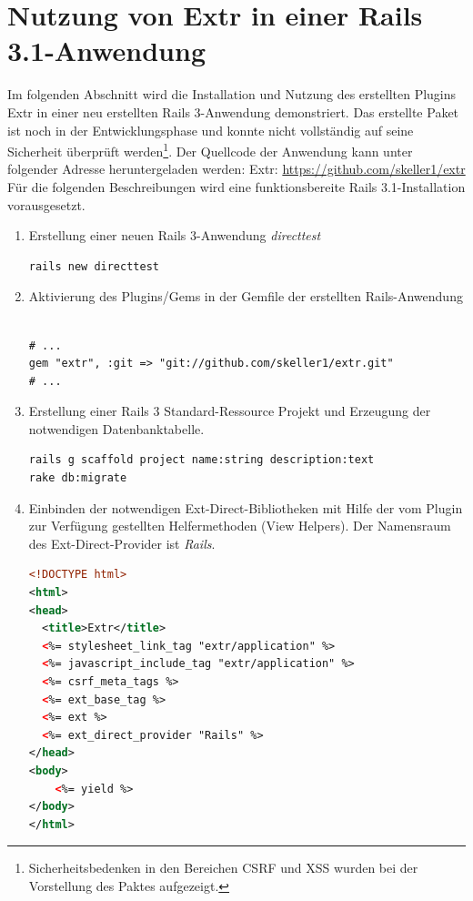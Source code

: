\section{Nutzung von Extr in einer Rails 3.1-Anwendung}
Im folgenden Abschnitt wird die Installation und Nutzung des erstellten Plugins Extr in einer neu erstellten Rails 3-Anwendung demonstriert. Das erstellte Paket ist noch in der Entwicklungsphase und konnte nicht vollständig auf seine Sicherheit überprüft werden\footnote{Sicherheitsbedenken in den Bereichen CSRF und XSS wurden bei der Vorstellung des Paktes aufgezeigt.}. Der Quellcode der Anwendung kann unter folgender Adresse heruntergeladen werden:
Extr: \href{https://github.com/skeller1/extr}{https://github.com/skeller1/extr}
Für die folgenden Beschreibungen wird eine funktionsbereite Rails 3.1-Installation vorausgesetzt.
\begin{enumerate}
\item
Erstellung einer neuen Rails 3-Anwendung \emph{directtest}
\begin{lstlisting}[frame=single, numbers=none]
rails new directtest
\end{lstlisting}
\item
Aktivierung des Plugins/Gems in der Gemfile der erstellten Rails-Anwendung

\begin{lstlisting}[frame=single, numbers=none]

# ...
gem "extr", :git => "git://github.com/skeller1/extr.git"
# ...

\end{lstlisting}

\item
Erstellung einer Rails 3 Standard-Ressource Projekt und Erzeugung der notwendigen Datenbanktabelle.

\begin{lstlisting}[frame=single, numbers=none]
rails g scaffold project name:string description:text
rake db:migrate
\end{lstlisting}

\item
Einbinden der notwendigen Ext-Direct-Bibliotheken mit Hilfe der vom Plugin zur Verfügung gestellten Helfermethoden (View Helpers). Der Namensraum des Ext-Direct-Provider ist \emph{Rails}.

\begin{lstlisting}[language=xml,frame=single,title=\emph{app/views/layouts/application.html.erb}, numbers=none]
<!DOCTYPE html>
<html>
<head>
  <title>Extr</title>
  <%= stylesheet_link_tag "extr/application" %>
  <%= javascript_include_tag "extr/application" %>
  <%= csrf_meta_tags %>
  <%= ext_base_tag %>
  <%= ext %>
  <%= ext_direct_provider "Rails" %>
</head>
<body>
    <%= yield %>
</body>
</html>
\end{lstlisting}


\end{enumerate}
